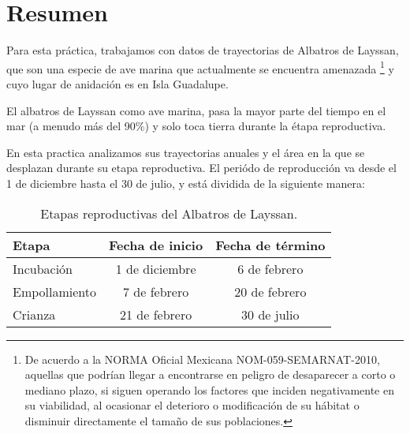 
\section{Resumen}

Para esta práctica, trabajamos con datos de trayectorias de Albatros de Layssan,
que son una especie de ave marina que actualmente se encuentra amenazada
\footnote{De acuerdo a la NORMA Oficial Mexicana NOM-059-SEMARNAT-2010, aquellas
que podrían llegar a encontrarse en peligro de desaparecer a corto o mediano
plazo, si siguen operando los factores que inciden negativamente en su
viabilidad, al ocasionar el deterioro o modificación de su hábitat o disminuir
directamente el tamaño de sus poblaciones.} y cuyo lugar de anidación es en Isla
Guadalupe.

El albatros de Layssan como ave marina, pasa la mayor parte del tiempo en el mar
(a menudo más del 90\%) y solo toca tierra durante la étapa reproductiva.

En esta practica analizamos sus trayectorias anuales y el área en la que se
desplazan durante su etapa reproductiva. El periódo de reproducción va desde el
1 de diciembre hasta el 30 de julio, y está dividida de la siguiente manera:

\begin{table}[h!]
\caption{Etapas reproductivas del Albatros de Layssan.}
\begin{center}
\begin{tabular}{lcc}
    Etapa & Fecha de inicio & Fecha de término \\
    \hline
    Incubación & 1 de diciembre & 6 de febrero \\
    Empollamiento & 7 de febrero & 20 de febrero \\
    Crianza & 21 de febrero & 30 de julio
\end{tabular}
\end{center}
\end{table}
